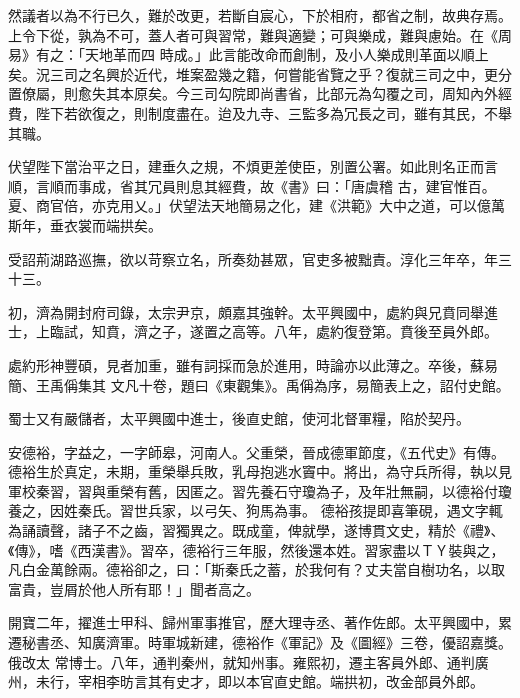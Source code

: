 \begin{pinyinscope}
 然議者以為不行已久，難於改更，若斷自宸心，下於相府，都省之制，故典存焉。上令下從，孰為不可，蓋人者可與習常，難與適變；可與樂成，難與慮始。在《周易》有之：「天地革而四
 時成。」此言能改命而創制，及小人樂成則革面以順上矣。況三司之名興於近代，堆案盈幾之籍，何嘗能省覽之乎？復就三司之中，更分置僚屬，則愈失其本原矣。今三司勾院即尚書省，比部元為勾覆之司，周知內外經費，陛下若欲復之，則制度盡在。迨及九寺、三監多為冗長之司，雖有其民，不舉其職。



 伏望陛下當治平之日，建垂久之規，不煩更差使臣，別置公署。如此則名正而言順，言順而事成，省其冗員則息其經費，故《書》曰：「唐虞稽
 古，建官惟百。夏、商官倍，亦克用乂。」伏望法天地簡易之化，建《洪範》大中之道，可以億萬斯年，垂衣裳而端拱矣。



 受詔荊湖路巡撫，欲以苛察立名，所奏劾甚眾，官吏多被黜責。淳化三年卒，年三十三。



 初，濟為開封府司錄，太宗尹京，頗嘉其強幹。太平興國中，處約與兄賁同舉進士，上臨試，知賁，濟之子，遂置之高等。八年，處約復登第。賁後至員外郎。



 處約形神豐碩，見者加重，雖有詞採而急於進用，時論亦以此薄之。卒後，蘇易簡、王禹偁集其
 文凡十卷，題曰《東觀集》。禹偁為序，易簡表上之，詔付史館。



 蜀士又有嚴儲者，太平興國中進士，後直史館，使河北督軍糧，陷於契丹。



 安德裕，字益之，一字師皋，河南人。父重榮，晉成德軍節度，《五代史》有傳。德裕生於真定，未期，重榮舉兵敗，乳母抱逃水竇中。將出，為守兵所得，執以見軍校秦習，習與重榮有舊，因匿之。習先養石守瓊為子，及年壯無嗣，以德裕付瓊養之，因姓秦氏。習世兵家，以弓矢、狗馬為事。
 德裕孩提即喜筆硯，遇文字輒為誦讀聲，諸子不之齒，習獨異之。既成童，俾就學，遂博貫文史，精於《禮》、《傳》，嗜《西漢書》。習卒，德裕行三年服，然後還本姓。習家盡以ＴＹ裝與之，凡白金萬餘兩。德裕卻之，曰：「斯秦氏之蓄，於我何有？丈夫當自樹功名，以取富貴，豈屑於他人所有耶！」聞者高之。



 開寶二年，擢進士甲科、歸州軍事推官，歷大理寺丞、著作佐郎。太平興國中，累遷秘書丞、知廣濟軍。時軍城新建，德裕作《軍記》及《圖經》三卷，優詔嘉獎。俄改太
 常博士。八年，通判秦州，就知州事。雍熙初，遷主客員外郎、通判廣州，未行，宰相李昉言其有史才，即以本官直史館。端拱初，改金部員外郎。




\end{pinyinscope}
